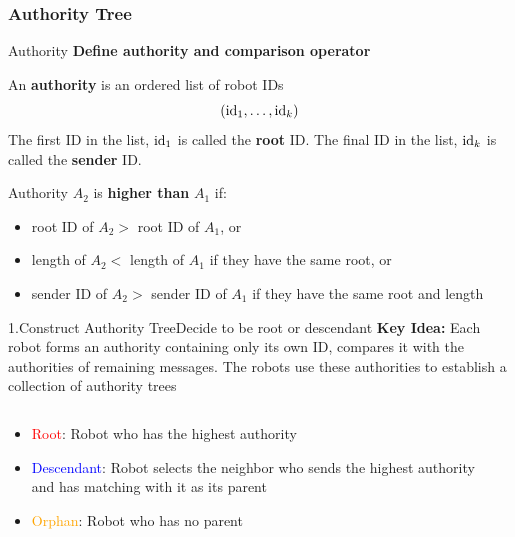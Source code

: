 \documentclass[10pt]{beamer}
\begin{document}
\subsubsection[Algorithm: Authority]{Authority Tree}
\begin{frame}{Authority}
  \textbf{Define authority and comparison operator}
  \begin{definition}
    \small{An \textbf{authority} is an ordered list of robot IDs
      $$({\rm id}_1, \ldots, {\rm id}_k)$$
      The first ID in the list, ${\rm id}_1$ is called the \textbf{root} ID.
      The final ID in the list, ${\rm id}_k$ is called the \textbf{sender} ID.}
  \end{definition}
  \begin{definition}
    \small{Authority $A_2$ is \textbf{higher than} $A_1$ if:}
    \begin{itemize}
    \item \small{root ID of $A_2 >$ root ID of $A_1$, or}
    \item \small{length of $A_2 <$  length of $A_1$ if they have the same root, or}
    \item \small{sender ID of $A_2 >$ sender ID of $A_1$ if they have the same root and length}
    \end{itemize}
  \end{definition}
\end{frame}
\begin{frame}{1.Construct Authority Tree}{Decide to be root or descendant}
  \textbf{Key Idea:} Each robot forms an authority containing only its own ID,
  compares it with the authorities of remaining messages. The robots use these
  authorities to establish a collection of authority trees
  \begin{columns}[T] %
    \begin{column}{.45\textwidth}
      \begin{itemize}
      \item {\textcolor{red}{Root}: Robot who has the highest authority}
      \item {\textcolor{blue}{Descendant}: Robot selects the neighbor who sends
          the highest authority and has matching with it as its parent}
      \item {\textcolor{orange}{Orphan}: Robot who has no parent}
      \end{itemize}     
    \end{column}%
    \begin{column}{.5\textwidth}
       
    \end{column}
  \end{columns}
\end{frame}
\end{document}
